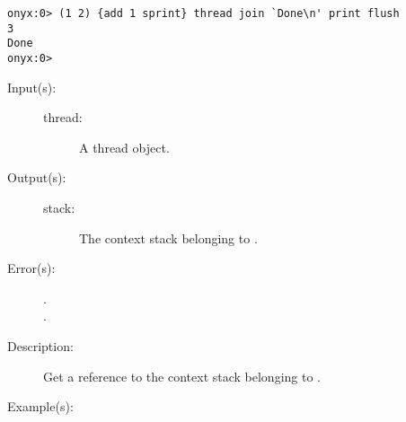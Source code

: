 \begin{description}
\begin{description}
\begin{verbatim}
onyx:0> (1 2) {add 1 sprint} thread join `Done\n' print flush
3
Done
onyx:0>
		\end{verbatim}
	\end{description}
\label{systemdict:threadcstack}
\item[{\onyxop{thread}{threadcstack}{stack}}: ]
	\begin{description}\item[]
	\item[Input(s): ]
		\begin{description}\item[]
		\item[thread: ]
			A thread object.
		\end{description}
	\item[Output(s): ]
		\begin{description}\item[]
		\item[stack: ]
			The context stack belonging to .
		\end{description}
	\item[Error(s): ]
		\begin{description}\item[]
		\item[.]
		\item[.]
		\end{description}
	\item[Description: ]
		Get a reference to the context stack belonging to
		.
	\item[Example(s): ]\begin{verbatim}


\end{verbatim}
\end{description}
\end{description}
